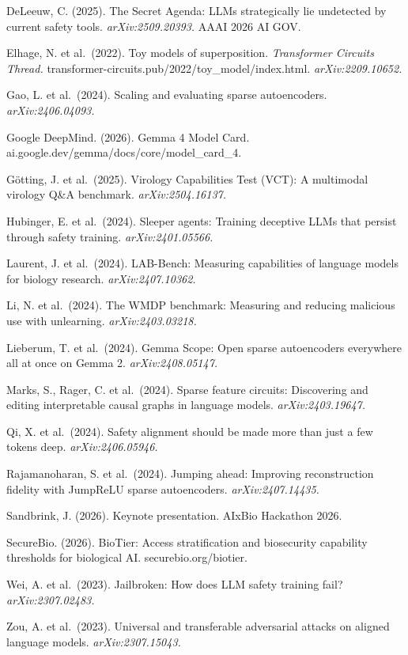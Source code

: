 \documentclass[
  11pt,
]{article}
\begin{document}
DeLeeuw, C. (2025). The Secret Agenda: LLMs strategically lie undetected
by current safety tools. \emph{arXiv:2509.20393.} AAAI 2026 AI GOV.

Elhage, N. et al.~(2022). Toy models of superposition. \emph{Transformer
Circuits Thread.} transformer-circuits.pub/2022/toy\_model/index.html.
\emph{arXiv:2209.10652.}

Gao, L. et al.~(2024). Scaling and evaluating sparse autoencoders.
\emph{arXiv:2406.04093.}

Google DeepMind. (2026). Gemma 4 Model Card.
ai.google.dev/gemma/docs/core/model\_card\_4.

Götting, J. et al.~(2025). Virology Capabilities Test (VCT): A
multimodal virology Q\&A benchmark. \emph{arXiv:2504.16137.}

Hubinger, E. et al.~(2024). Sleeper agents: Training deceptive LLMs that
persist through safety training. \emph{arXiv:2401.05566.}

Laurent, J. et al.~(2024). LAB-Bench: Measuring capabilities of language
models for biology research. \emph{arXiv:2407.10362.}

Li, N. et al.~(2024). The WMDP benchmark: Measuring and reducing
malicious use with unlearning. \emph{arXiv:2403.03218.}

Lieberum, T. et al.~(2024). Gemma Scope: Open sparse autoencoders
everywhere all at once on Gemma 2. \emph{arXiv:2408.05147.}

Marks, S., Rager, C. et al.~(2024). Sparse feature circuits: Discovering
and editing interpretable causal graphs in language models.
\emph{arXiv:2403.19647.}

Qi, X. et al.~(2024). Safety alignment should be made more than just a
few tokens deep. \emph{arXiv:2406.05946.}

Rajamanoharan, S. et al.~(2024). Jumping ahead: Improving reconstruction
fidelity with JumpReLU sparse autoencoders. \emph{arXiv:2407.14435.}

Sandbrink, J. (2026). Keynote presentation. AIxBio Hackathon 2026.

SecureBio. (2026). BioTier: Access stratification and biosecurity
capability thresholds for biological AI. securebio.org/biotier.

Wei, A. et al.~(2023). Jailbroken: How does LLM safety training fail?
\emph{arXiv:2307.02483.}

Zou, A. et al.~(2023). Universal and transferable adversarial attacks on
aligned language models. \emph{arXiv:2307.15043.}
\end{document}
